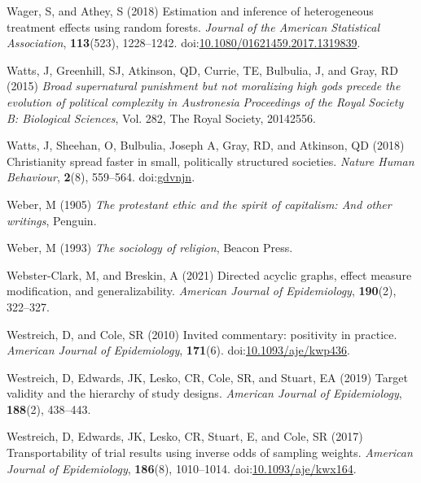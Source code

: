 \documentclass[
  single column]{article}
\newlength{\cslhangindent}
\newenvironment{CSLReferences}[2] %
 {\begin{list}{}{%
  \setlength{\itemindent}{0pt}
  \setlength{\leftmargin}{0pt}
  \setlength{\parsep}{0pt}
  \ifodd #1
   \setlength{\leftmargin}{\cslhangindent}
   \setlength{\itemindent}{-1\cslhangindent}
  \fi
  \setlength{\itemsep}{#2\baselineskip}}}
 {\end{list}}
\begin{document}
\begin{CSLReferences}{1}{0}
Wager, S, and Athey, S (2018) Estimation and inference of heterogeneous
treatment effects using random forests. \emph{Journal of the American
Statistical Association}, \textbf{113}(523), 1228--1242.
doi:\href{https://doi.org/10.1080/01621459.2017.1319839}{10.1080/01621459.2017.1319839}.

Watts, J, Greenhill, SJ, Atkinson, QD, Currie, TE, Bulbulia, J, and
Gray, RD (2015) \emph{Broad supernatural punishment but not moralizing
high gods precede the evolution of political complexity in
{A}ustronesia} \emph{Proceedings of the Royal Society B: Biological
Sciences}, Vol. 282, The Royal Society, 20142556.

Watts, J, Sheehan, O, Bulbulia, Joseph A, Gray, RD, and Atkinson, QD
(2018) Christianity spread faster in small, politically structured
societies. \emph{Nature Human Behaviour}, \textbf{2}(8), 559--564.
doi:\href{https://doi.org/gdvnjn}{gdvnjn}.

Weber, M (1905) \emph{The protestant ethic and the spirit of capitalism:
And other writings}, Penguin.

Weber, M (1993) \emph{The sociology of religion}, Beacon Press.

Webster-Clark, M, and Breskin, A (2021) Directed acyclic graphs, effect
measure modification, and generalizability. \emph{American Journal of
Epidemiology}, \textbf{190}(2), 322--327.

Westreich, D, and Cole, SR (2010) Invited commentary: positivity in
practice. \emph{American Journal of Epidemiology}, \textbf{171}(6).
doi:\href{https://doi.org/10.1093/aje/kwp436}{10.1093/aje/kwp436}.

Westreich, D, Edwards, JK, Lesko, CR, Cole, SR, and Stuart, EA (2019)
Target validity and the hierarchy of study designs. \emph{American
Journal of Epidemiology}, \textbf{188}(2), 438--443.

Westreich, D, Edwards, JK, Lesko, CR, Stuart, E, and Cole, SR (2017)
Transportability of trial results using inverse odds of sampling
weights. \emph{American Journal of Epidemiology}, \textbf{186}(8),
1010--1014.
doi:\href{https://doi.org/10.1093/aje/kwx164}{10.1093/aje/kwx164}.


\end{CSLReferences}
\end{document}
